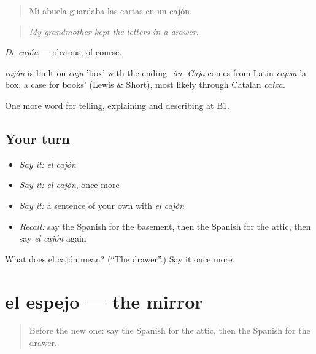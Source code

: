 \begin{quote}
Mi abuela guardaba las cartas en un cajón.
\end{quote}

\begin{quote}
\emph{My grandmother kept the letters in a drawer.}
\end{quote}

\emph{De cajón} — obvious, of course.

\begin{cousinweb}
\emph{cajón} is built on \emph{caja} 'box' with the ending \emph{-ón}. \emph{Caja} comes from Latin \emph{capsa} 'a box, a case for books' (Lewis \& Short), most likely through Catalan \emph{caixa}.
\end{cousinweb}

\begin{grammarlens}[title={What you've built}]
One more word for telling, explaining and describing at B1.
\end{grammarlens}

\subsection*{Your turn}
\begin{itemize}
\raggedright
  \item \emph{Say it:} \emph{el cajón}
  \item \emph{Say it:} \emph{el cajón}, once more
  \item \emph{Say it:} a sentence of your own with \emph{el cajón}
  \item \emph{Recall:} say the Spanish for the basement, then the Spanish for the attic, then say \emph{el cajón} again
\end{itemize}

\begin{tcolorbox}[breakable,colback=teal!4,colframe=teal!35!black,title={Before you move on}]
What does el cajón mean? (\textquotedblleft{}The drawer\textquotedblright{}.) Say it once more.
\end{tcolorbox}
\section[el espejo]{el espejo — the mirror}

\label{lesson:ES-C774-espejo}



\begin{quote}
Before the new one: say the Spanish for the attic, then the Spanish for the drawer.
\end{quote}

